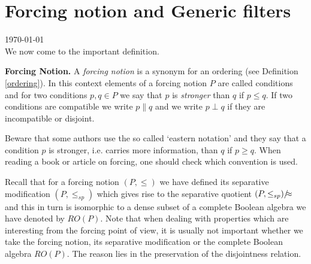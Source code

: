\cfoot{}\rhead{\thepage}

%


\thispagestyle{empty}

\section{Forcing notion and Generic filters}

{\tiny \today } \\[0.5cm]


We now come to the important definition.

\begin{definition}{\bf Forcing Notion.}\label{forcing-notion}
A \emph{forcing notion} is a synonym for an ordering (see Definition \ref{ordering}).
In this context elements of a forcing notion $P$ are called conditions and for two conditions $p,q\in P$ we say that
$p$ is \emph{stronger} than $q$ if $p\leq q$. If two conditions are compatible we write $p\parallel q$ and we write
$p\perp q$ if they are incompatible or disjoint.
\end{definition}

\begin{note}
Beware that some authors use the so called `eastern notation' and they say that a condition $p$ is stronger, i.e. carries more information, than $q$ if $p\geq q$. When reading a book or article on forcing, one should check which convention is used.
\end{note}

Recall that for a forcing notion $(P,\leq)$ we have defined its separative modification $(P,\leq_{sp})$ which
gives rise to the separative quotient $(P,\leq_{sp})/\hskip-2mm\approx$ and this in turn is
isomorphic to a dense subset of a complete
Boolean algebra we have denoted by $RO(P)$. Note that when dealing with properties which are interesting from the forcing point
of view, it is usually not important whether we take the forcing notion, its separative modification or the complete Boolean algebra $RO(P)$.
The reason lies in the preservation of the disjointness relation.


